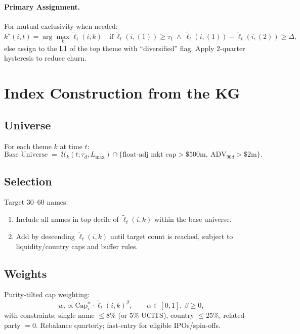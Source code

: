 \documentclass[11pt]{article}
\begin{document}
\paragraph{Primary Assignment.} For mutual exclusivity when needed:
\[
k^\star(i,t)=\arg\max_k \tilde{\ell}_t(i,k)\quad \text{if}\ \tilde{\ell}_t(i,(1))\ge \tau_1\ \land\ \tilde{\ell}_t(i,(1))-\tilde{\ell}_t(i,(2))\ge \Delta,
\]
else assign to the L1 of the top theme with ``diversified'' flag. Apply 2-quarter hysteresis to reduce churn.

\section{Index Construction from the KG}

\subsection{Universe}
For each theme $k$ at time $t$:
\[
\text{Base Universe} \;=\; \mathcal{U}_k(t;\tau_d, L_{\max}) \cap \{ \text{float-adj mkt cap}>\$500\text{m},\ \text{ADV}_{90d}>\$2\text{m} \}.
\]

\subsection{Selection}
Target 30--60 names:
\begin{enumerate}[leftmargin=*]
\item Include all names in top decile of $\tilde{\ell}_t(i,k)$ within the base universe.
\item Add by descending $\tilde{\ell}_t(i,k)$ until target count is reached, subject to liquidity/country caps and buffer rules.
\end{enumerate}

\subsection{Weights}
Purity-tilted cap weighting:
\[
w_i \propto \mathrm{Cap}_i^{\alpha} \cdot \tilde{\ell}_t(i,k)^{\beta},\qquad \alpha\in[0,1],\ \beta\ge 0,
\]
with constraints: single name $\le 8\%$ (or 5\% UCITS), country $\le 25\%$, related-party $=0$. Rebalance quarterly; fast-entry for eligible IPOs/spin-offs.

\end{document}
